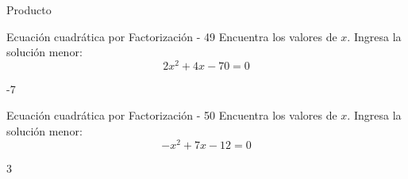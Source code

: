 \documentclass[a4,11pt]{aleph-notas}
\begin{document}
\begin{quiz}{Producto}
\begin{numerical}[]%
    {Ecuación cuadrática por Factorización - 49}
    Encuentra los valores de $x$. Ingresa la solución menor:
    \[
        2 x^{2} + 4 x - 70 = 0
    \]
    \item[] -7
\end{numerical}

\begin{numerical}[]%
    {Ecuación cuadrática por Factorización - 50}
    Encuentra los valores de $x$. Ingresa la solución menor:
    \[
        - x^{2} + 7 x - 12 = 0
    \]
    \item[] 3
\end{numerical}




\end{quiz}
\end{document}
